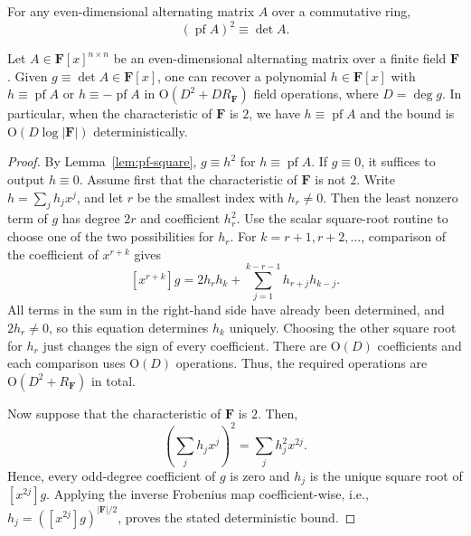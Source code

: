 \documentclass[10pt,a4paper]{amsart}
\DeclareMathOperator{\pf}{pf}
\newcommand{\bF}{\mathbf{F}}
\begin{document}
\begin{lemma}\label{lem:pf-square}
For any even-dimensional alternating matrix $A$ over a commutative ring,
\[(\pf A)^2\equiv\det A.\]
\end{lemma}

\begin{lemma}\label{lem:pfaffian}
Let $A\in\bF[x]^{n\times n}$ be an even-dimensional alternating matrix over a finite field $\bF$.
Given $g\equiv\det A \in \bF[x]$, one can recover a polynomial $h\in \bF[x]$ with $h\equiv\pf A$ or $h\equiv-\pf A$ in $\mathrm{O}(D^2+D R_{\bF})$ field operations, where $D=\deg g$.
In particular, when the characteristic of $\mathbf{F}$ is $2$, we have $h\equiv\pf A$ and the bound is $\mathrm{O}(D\log|\bF|)$ deterministically.
\end{lemma}

\begin{proof}
By Lemma~\ref{lem:pf-square}, $g\equiv h^2$ for $h\equiv \pf A$.
If $g\equiv 0$, it suffices to output $h \equiv 0$.
Assume first that the characteristic of $\mathbf{F}$ is not $2$.
Write $h=\sum_jh_jx^j$, and let $r$ be the smallest index with $h_r\ne0$.
Then the least nonzero term of $g$ has degree $2r$ and coefficient $h_r^2$.
Use the scalar square-root routine to choose one of the two possibilities for $h_r$.
For $k=r+1,r+2,\dots$, comparison of the coefficient of $x^{r+k}$ gives
\[[x^{r+k}]g = 2h_rh_k + \sum_{j = 1}^{k - r - 1}h_{r+j}h_{k-j}.\]
All terms in the sum in the right-hand side have already been determined, and $2h_r\ne0$, so this equation determines $h_k$ uniquely.
Choosing the other square root for $h_r$ just changes the sign of every coefficient.
There are $\mathrm{O}(D)$ coefficients and each comparison uses $\mathrm{O}(D)$ operations.
Thus, the required operations are $\mathrm{O}(D^2 + R_\bF)$ in total.

Now suppose that the characteristic of $\mathbf{F}$ is $2$.
Then,
\[\left(\sum_jh_jx^j\right)^2=\sum_jh_j^2x^{2j}.\]
Hence, every odd-degree coefficient of $g$ is zero and $h_j$ is the unique square root of $[x^{2j}]g$.
Applying the inverse Frobenius map coefficient-wise, i.e., $h_j = ([x^{2j}]g)^{|\bF|/2}$, proves the stated deterministic bound.
\end{proof}
\end{document}
